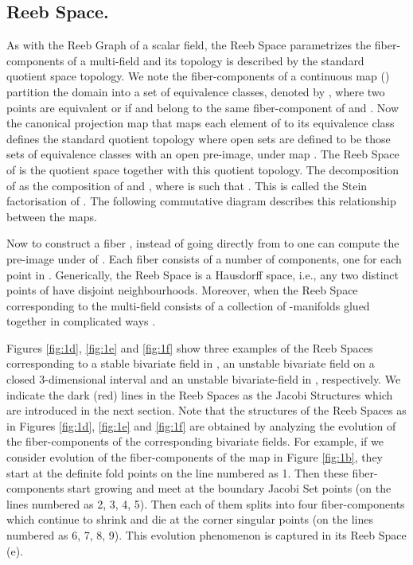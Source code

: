 \documentclass[twocolumn]{article}
\newcommand{\RS}{\mathbb{W}_f}
\newcommand{\figref}[1]{Figure \ref{fig:#1}}
\newcommand{\threefigref}[3]{Figures \ref{fig:#1}, \ref{fig:#2} and \ref{fig:#3}}
\begin{document}
\subsection*{Reeb Space.} As with the Reeb Graph of a scalar field,
 the Reeb Space parametrizes the fiber-components of a
 multi-field and its topology is described by the
 standard quotient space topology.
We note the fiber-components of a continuous map
 () partition the domain  into a set 
of equivalence classes, denoted by ,
where two points  are equivalent or  if
 and  belong to the same fiber-component of  and . 
Now the canonical projection map
 that maps each element of 
to its equivalence class defines the standard quotient topology where
open sets are defined to be those sets of equivalence classes with an
open pre-image, under map . The Reeb Space of  is the quotient
space  together with this quotient topology.
The decomposition of  as the composition of  and ,
where  is such that . This is called the Stein factorisation of .
The following commutative diagram describes this relationship between the maps.
\begin{center}
\end{center}
\noindent
Now to construct a fiber , instead of going directly from
 to  one can compute the pre-image under  of
. Each fiber consists of a number of components, one for each point in .
Generically, the Reeb Space is a Hausdorff space, i.e., any two distinct points of
  have disjoint neighbourhoods.
Moreover, when  the Reeb Space corresponding to the multi-field
 consists of a collection of -manifolds glued together in
complicated ways \cite{2008-edels-reebspace}.

\threefigref{1d}{1e}{1f} show three examples of the Reeb Spaces
corresponding to a stable bivariate
field in , an unstable bivariate field on a closed 3-dimensional interval
and an unstable bivariate-field in , 
respectively. We indicate the dark (red) lines in the Reeb Spaces as the Jacobi Structures which are introduced in the next section.
Note that the structures of
the Reeb Spaces as in \threefigref{1d}{1e}{1f} are obtained by analyzing the evolution of the
fiber-components of the corresponding bivariate fields. For example, if we consider evolution
of the fiber-components of the map in \figref{1b}, 
they start at the definite fold points on the line numbered as 1.
Then these fiber-components start growing and meet at the boundary
Jacobi Set points (on the lines numbered as 2, 3, 4, 5). 
Then each of them splits into four fiber-components which continue to shrink 
and die at the corner singular points (on the lines numbered as 6, 7,
8, 9). This evolution phenomenon is captured in its Reeb Space (e). 
%
\end{document}
